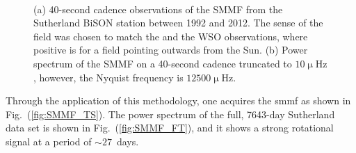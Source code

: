 \begin{figure}[ht!]
	\centering
	 \\ 
	\centering
	\caption{(a) 40-second cadence observations of the SMMF from the Sutherland BiSON station between 1992 and 2012. The sense of the field was chosen to match the \citet{chaplin_studies_2003} and the WSO observations, where positive is for a field pointing outwards from the Sun. (b) Power spectrum of the SMMF on a 40-second cadence truncated to $10 \upmu\mathrm{Hz}$, however, the Nyquist frequency is $12500 \upmu\mathrm{Hz}$.}  
	\label{fig:BiSON_SMMF}
\end{figure}

Through the application of this methodology, one acquires the \gls{smmf} as shown in Fig.~(\ref{fig:SMMF_TS}). The power spectrum of the full, 7643-day Sutherland data set is shown in Fig.~(\ref{fig:SMMF_FT}), and it shows a strong rotational signal at a period of $\sim27$~days. 


